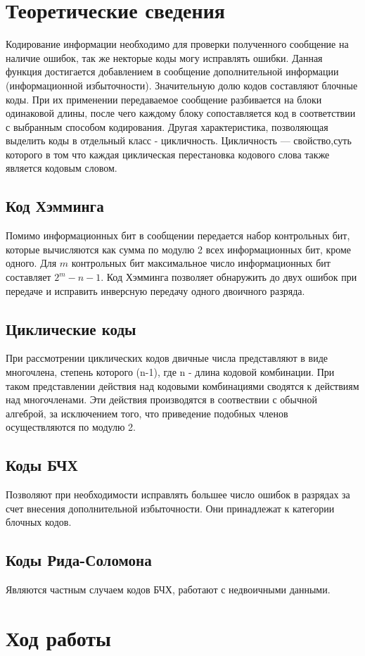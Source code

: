 \documentclass[10pt,a4paper,oneside]{article}
\begin{document}
\section{Теоретические сведения}
Кодирование информации необходимо для проверки полученного сообщение на наличие ошибок, так же некторые коды могу исправлять ошибки. Данная функция достигается добавлением в сообщение дополнительной информации (информационной избыточности).
Значительную долю кодов составляют блочные коды. При их применении передаваемое сообщение разбивается на блоки одинаковой длины, после чего каждому блоку сопоставляется код в соответствии с выбранным способом кодирования.
Другая характеристика, позволяющая выделить коды в отдельный класс - цикличность. Цикличность — свойство,суть которого в том что каждая циклическая перестановка кодового слова также является кодовым словом. 
\subsection{Код Хэмминга}
Помимо информационных бит в сообщении передается набор контрольных бит, которые вычисляются как сумма по модулю 2 всех информационных бит, кроме одного. Для $m$ контрольных бит максимальное число информационных бит составляет $2^m-n-1$. Код Хэмминга позволяет обнаружить до двух ошибок при передаче и исправить инверсную передачу одного двоичного разряда. 
\subsection{Циклические коды}
При рассмотрении циклических кодов двичные числа представляют в виде многочлена, степень которого (n-1), где n - длина кодовой комбинации. При таком представлении действия над кодовыми комбинациями сводятся к действиям над многочленами. Эти действия производятся в соотвествии с обычной алгеброй, за исключением того, что приведение подобных членов осуществляются по модулю 2.
\subsection{Коды БЧХ}
Позволяют при необходимости исправлять большее число ошибок в разрядах за счет внесения дополнительной избыточности. Они принадлежат к  категории блочных кодов.
\subsection{Коды Рида-Соломона}
Являются частным случаем кодов БЧХ, работают с недвоичными данными.
\newpage
\section{Ход работы}
\end{document}
